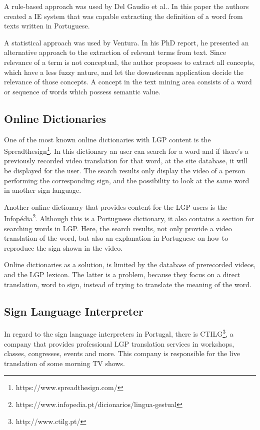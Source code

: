 A rule-based approach was used by Del Gaudio et al.\cite{del2007automatic}.
In this paper the authors created a IE system that was capable extracting the definition of a word from texts written in Portuguese.

A statistical approach was used by Ventura\cite{ventura2014automatic}.
In his PhD report, he presented an alternative approach to the extraction of relevant terms from text.
Since relevance of a term is not conceptual, the author proposes to extract all concepts, which have a less fuzzy nature, and let the downstream application decide the relevance of those concepts.
A concept in the text mining area consists of a word or sequence of words which possess semantic value.

\subsection{Online Dictionaries}

One of the most known online dictionaries with \gls{LGP} content is the Spreadthesign\footnote{https://www.spreadthesign.com/}.
In this dictionary an user can search for a word and if there's a previously recorded video translation for that word, at the site database, it will be displayed for the user.
The search results only display the video of a person performing the corresponding sign, and the possibility to look at the same word in another sign language.

Another online dictionary that provides content for the \gls{LGP} users is the Infopédia\footnote{https://www.infopedia.pt/dicionarios/lingua-gestual}.
Although this is a Portuguese dictionary, it also contains a section for searching words in \gls{LGP}.
Here, the search results, not only provide a video translation of the word, but also an explanation in Portuguese on how to reproduce the sign shown in the video.

Online dictionaries as a solution, is limited by the database of prerecorded videos, and the \gls{LGP} lexicon.
The latter is a problem, because they focus on a direct translation, word to sign, instead of trying to translate the meaning of the word.

\subsection{Sign Language Interpreter}

In regard to the sign language interpreters in Portugal, there is CTILG\footnote{http://www.ctilg.pt/}, a company that provides professional \gls{LGP} translation services in workshops, classes, congresses, events and more.
This company is responsible for the live translation of some morning TV shows.

